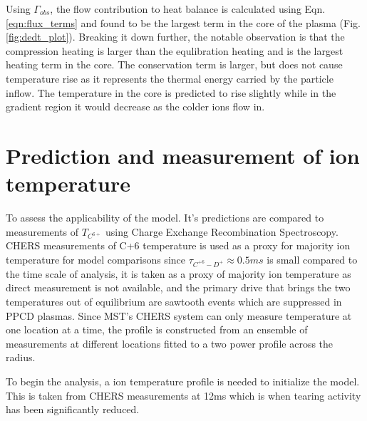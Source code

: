 \documentclass[aip, pop, preprint]{revtex4-1}
\begin{document}
Using $\Gamma_{obs}$, the flow
contribution to heat balance is calculated using Eqn. \ref{eqn:flux_terms} and found to be the largest term in
the core of the plasma (Fig. \ref{fig:dedt_plot}). Breaking it down further, the notable observation is
that the compression heating is larger than the equlibration heating and is the
largest heating term in the core. The conservation term is larger, but does not
cause temperature rise as it represents the thermal energy carried by the particle inflow. The temperature in the core is predicted to rise slightly
while in the gradient region it would decrease as the colder ions flow in.

\section{Prediction and measurement of ion temperature}


To assess the applicability of the model. It's predictions are compared to
measurements of $T_{C^{6+}}$ using Charge Exchange Recombination
Spectroscopy\cite{DenHartog1994,DenHartog2006Advancesinvited}. CHERS
measurements of C+6 temperature is used as a proxy for majority ion temperature
for model comparisons since $\tau_{C^{+6}-D^{+}} \approx 0.5ms$ is small compared to the time
scale of analysis, it is taken as a proxy of majority ion temperature as direct
measurement is not available\cite{Reardon2003}, and the primary drive that brings
the two temperatures out of equilibrium are sawtooth events which are
suppressed in PPCD plasmas\cite{Fiksel2009}. Since MST's CHERS system can only
measure temperature at one location at a time, the profile is constructed from
an ensemble of measurements at different locations fitted to a two power
profile across the radius.

To begin the analysis, a ion temperature profile is needed to initialize the model. This is
taken from CHERS measurements at 12ms which is when tearing activity has been significantly reduced. 
\end{document}
